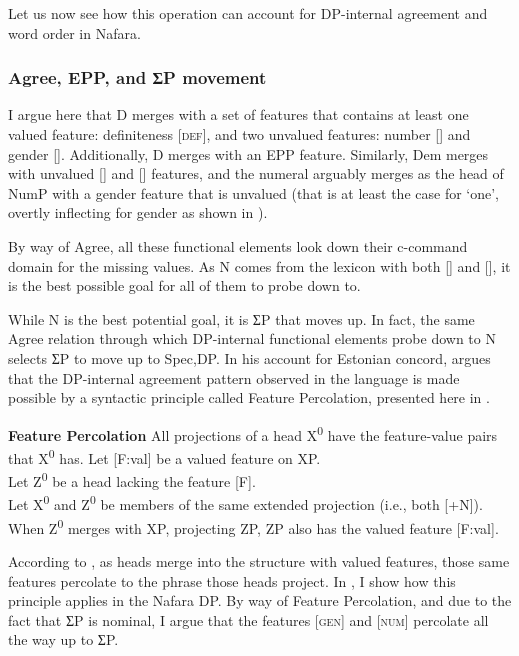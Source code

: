 \documentclass[output=paper]{langscibook}
\begin{document}
Let us now see how this operation can account for DP-internal agreement and word order in Nafara.


\subsubsection{Agree, EPP, and ƩP movement}

I argue here that D merges with a set of features that contains at least one valued feature: definiteness [\textsc{def}], and two unvalued features: number [{\NUM}] and gender [{\GEN}]. Additionally, D merges with an EPP feature. Similarly, Dem merges with unvalued [{\NUM}] and [{\GEN}] features, and the numeral arguably merges as the head of NumP with a gender feature that is unvalued (that is at least the case for ‘one’, overtly inflecting for gender as shown in ).  

By way of Agree, all these functional elements look down their c-command domain for the missing values. As N comes from the lexicon with both [{\NUM}] and [{\GEN}], it is the best possible goal for all of them to probe down to. 

While N is the best potential goal, it is ƩP that moves up. In fact, the same Agree relation through which DP-internal functional elements probe down to N selects ƩP to move up to Spec,DP. In his account for Estonian concord, \citet{Norris2014} argues that the DP-internal agreement pattern observed in the language is made possible by a syntactic principle called Feature Percolation, presented here in .


\begin{exe}\ex\label{ex:baron:19}
\textbf{Feature Percolation} \citep[135 (242)]{Norris2014}
\xlista
\ex All projections of a head X\textsuperscript{0} have the feature-value pairs that X\textsuperscript{0} has.
\ex Let [F:val] be a valued feature on XP.\\
   Let Z\textsuperscript{0} be a head lacking the feature [F].\\
   Let X\textsuperscript{0} and Z\textsuperscript{0} be members of the same extended projection (i.e., both [+N]).\\
   When Z\textsuperscript{0} merges with XP, projecting ZP, ZP also has the valued feature [F:val].
\endxlista
\end{exe}


According to , as heads merge into the structure with valued features, those same features percolate to the phrase those heads project. In , I show how this principle applies in the Nafara DP. By way of Feature Percolation, and due to the fact that ƩP is nominal, I argue that the features \textsc{[gen]} and \textsc{[num]} percolate all the way up to ƩP. 
\end{document}
